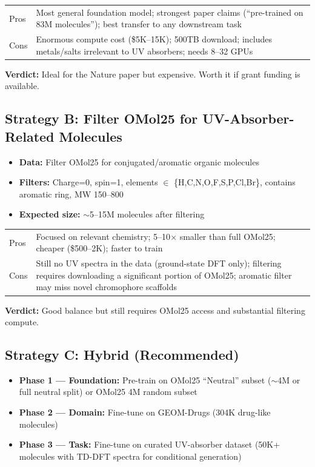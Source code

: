 \documentclass[11pt,a4paper]{article}
\begin{document}
\begin{tabular}{@{}lp{10cm}@{}}
\toprule
\textcolor{best}{Pros} & Most general foundation model; strongest paper claims
(``pre-trained on 83M molecules''); best transfer to any downstream task \\
\textcolor{bad}{Cons} & Enormous compute cost (\$5K--15K); 500TB download;
includes metals/salts irrelevant to UV absorbers; needs 8--32 GPUs \\
\bottomrule
\end{tabular}

\medskip
\textbf{Verdict:} Ideal for the Nature paper but expensive. Worth it if grant
funding is available.

\subsection{Strategy B: Filter OMol25 for UV-Absorber-Related Molecules}

\begin{itemize}[nosep]
    \item \textbf{Data:} Filter OMol25 for conjugated/aromatic organic molecules
    \item \textbf{Filters:} Charge=0, spin=1, elements $\in$ \{H,C,N,O,F,S,P,Cl,Br\},
          contains aromatic ring, MW 150--800
    \item \textbf{Expected size:} $\sim$5--15M molecules after filtering
\end{itemize}

\begin{tabular}{@{}lp{10cm}@{}}
\toprule
\textcolor{best}{Pros} & Focused on relevant chemistry; 5--10$\times$ smaller
than full OMol25; cheaper (\$500--2K); faster to train \\
\textcolor{bad}{Cons} & Still no UV spectra in the data (ground-state DFT only);
filtering requires downloading a significant portion of OMol25; aromatic
filter may miss novel chromophore scaffolds \\
\bottomrule
\end{tabular}

\medskip
\textbf{Verdict:} Good balance but still requires OMol25 access and
substantial filtering compute.

\subsection{Strategy C: Hybrid (Recommended)}

\begin{itemize}[nosep]
    \item \textbf{Phase 1 --- Foundation:} Pre-train on OMol25 ``Neutral'' subset
          ($\sim$4M or full neutral split) or OMol25 4M random subset
    \item \textbf{Phase 2 --- Domain:} Fine-tune on GEOM-Drugs (304K drug-like molecules)
    \item \textbf{Phase 3 --- Task:} Fine-tune on curated UV-absorber dataset
          (50K+ molecules with TD-DFT spectra for conditional generation)
\end{itemize}
\end{document}
